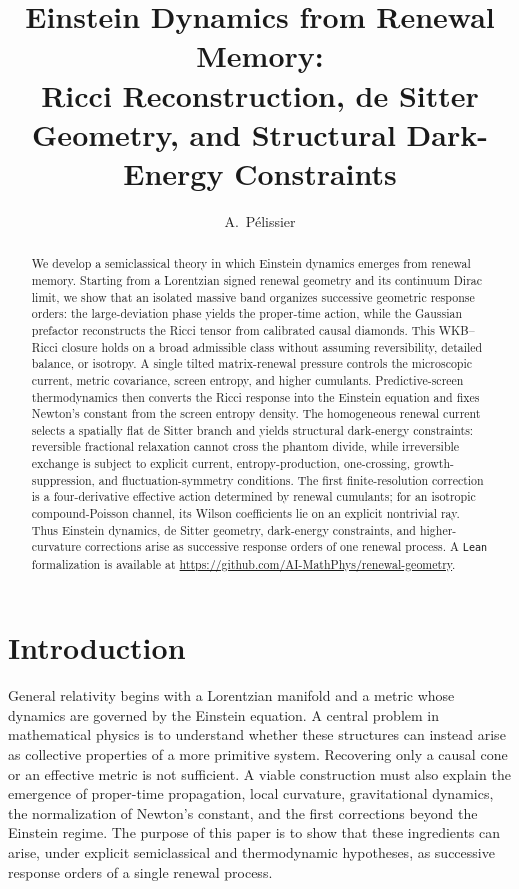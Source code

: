\documentclass[11pt]{article}
\title{\textbf{Einstein Dynamics from Renewal Memory:\\
Ricci Reconstruction, de Sitter Geometry, and Structural Dark-Energy Constraints}}
\author{A.~P\'elissier}
\date{}
\theoremstyle{definition}
\theoremstyle{remark}
\begin{document}
\maketitle


\begin{abstract}
We develop a semiclassical theory in which Einstein dynamics emerges from renewal memory. Starting from a Lorentzian signed renewal geometry and its continuum Dirac limit, we show that an isolated massive band organizes successive geometric response orders: the large-deviation phase yields the proper-time action, while the Gaussian prefactor reconstructs the Ricci tensor from calibrated causal diamonds. This WKB–Ricci closure holds on a broad admissible class without assuming reversibility, detailed balance, or isotropy.
%
A single tilted matrix-renewal pressure controls the microscopic current, metric covariance, screen entropy, and higher cumulants. Predictive-screen thermodynamics then converts the Ricci response into the Einstein equation and fixes Newton’s constant from the screen entropy density. The homogeneous renewal current selects a spatially flat de Sitter branch and yields structural dark-energy constraints: reversible fractional relaxation cannot cross the phantom divide, while irreversible exchange is subject to explicit current, entropy-production, one-crossing, growth-suppression, and fluctuation-symmetry conditions.
%
The first finite-resolution correction is a four-derivative effective action determined by renewal cumulants; for an isotropic compound-Poisson channel, its Wilson coefficients lie on an explicit nontrivial ray. Thus Einstein dynamics, de Sitter geometry, dark-energy constraints, and higher-curvature corrections arise as successive response orders of one renewal process.
%
A \texttt{Lean} formalization is available at
\url{https://github.com/AI-MathPhys/renewal-geometry}.
\end{abstract}




\setcounter{tocdepth}{2}
\tableofcontents

\section{Introduction}
\label{sec:intro}

General relativity begins with a Lorentzian manifold and a metric whose dynamics are governed by the Einstein equation.  A central problem in mathematical physics is to understand whether these structures can instead arise as collective properties of a more primitive system.  Recovering only a causal cone or an effective metric is not sufficient.  A viable construction must also explain the emergence of proper-time propagation, local curvature, gravitational dynamics, the normalization of Newton's constant, and the first corrections beyond the Einstein regime.  The purpose of this paper is to show that these ingredients can arise, under explicit semiclassical and thermodynamic hypotheses, as successive response orders of a single renewal process.
\end{document}
